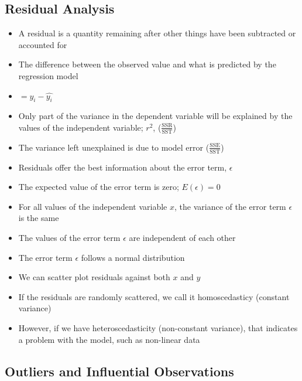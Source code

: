 \documentclass{article}
\begin{document}
\subsection{Residual Analysis}

\begin{itemize}
    \item A residual is a quantity remaining after other things have been subtracted or accounted for
    \item The difference between the observed value and what is predicted by the regression model
    \item $=y_i-\hat{y_i}$
    \item Only part of the variance in the dependent variable will be explained by the values of the independent variable; $r^2$, ($\frac{\text{SSR}}{\text{SST}}$)
    \item The variance left unexplained is due to model error ($\frac{\text{SSE}}{\text{SST}}$)
    \item Residuals offer the best information about the error term, $\epsilon$
    \item The expected value of the error term is zero; $E(\epsilon)=0$
    \item For all values of the independent variable $x$, the variance of the error term $\epsilon$ is the same
    \item The values of the error term $\epsilon$ are independent of each other
    \item The error term $\epsilon$ follows a normal distribution
    \item We can scatter plot residuals against both $x$ and $y$
    \item If the residuals are randomly scattered, we call it homoscedasticy (constant variance)
    \item However, if we have heteroscedasticity (non-constant variance), that indicates a problem with the model, such as non-linear data
\end{itemize}

\subsection{Outliers and Influential Observations}
\end{document}
